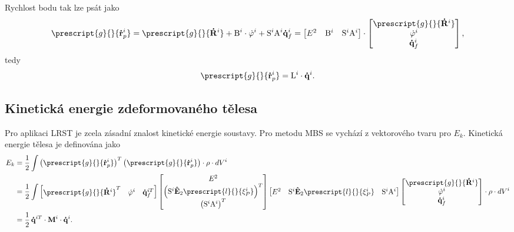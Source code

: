 Rychlost bodu tak lze psát jako
\begin{equation}\label{eq:MBS_vp}
	\prescript{g}{}{\mathbf{\dot{r}}_p^i}  =  \prescript{g}{}{\mathbf{\dot{R}}^i} + \mathrm{B}^i \cdot \dot{\varphi}^i + \mathrm{S}^{i} \mathrm{A}^i \mathbf{\dot{q}}_f^i = 
	\begin{bmatrix}
		E^2 & \mathrm{B}^i & \mathrm{S}^{i} \mathrm{A}^i
	\end{bmatrix} 
	\cdot
	\begin{bmatrix}
		\prescript{g}{}{\mathbf{\dot{R}}^i} \\ 
		\dot{\varphi}^i \\ 
		\mathbf{\dot{q}}_f^i
	\end{bmatrix}, 
\end{equation}
tedy
\begin{equation}\label{eq:MBS_derivace polohy}
	\prescript{g}{}{\mathbf{\dot{r}}_p^i}  = \mathrm{L}^i \cdot \mathbf{\dot{q}}^i.
\end{equation}

\subsection{Kinetická energie zdeformovaného tělesa}

Pro aplikaci LRST je zcela zásadní znalost kinetické energie soustavy. Pro metodu MBS se vychází z vektorového tvaru pro $ E_k $. Kinetická energie tělesa je definována jako
\begin{align}\label{eq:MBS_Ek}
	E_k &= \frac{1}{2} \int \left( \prescript{g}{}{\mathbf{\dot{r}}_p^i} \right)^T \left( \prescript{g}{}{\mathbf{\dot{r}}_p^i} \right) \cdot \rho \cdot dV^i \notag\\
	&= \frac{1}{2}\int 
	\begin{bmatrix}
		\prescript{g}{}{\mathbf{\dot{R}}^i}^T &
		\dot{\varphi}^i & 
		\mathbf{\dot{q}}_f^{iT}
	\end{bmatrix} 
	\begin{bmatrix}
		E^2 \\ \left( \mathrm{S}^{i}  \mathbf{\hat{E}}_2   \prescript{l}{}{\mathbf{\xi}^i_P}\right)^T  \\ \left( \mathrm{S}^{i} \mathrm{A}^i\right) ^T
	\end{bmatrix} 
	\begin{bmatrix}
		E^2 & \mathrm{S}^{i}  \mathbf{\hat{E}}_2   \prescript{l}{}{\mathbf{\xi}^i_P} & \mathrm{S}^{i} \mathrm{A}^i
	\end{bmatrix} 
	\begin{bmatrix}
		\prescript{g}{}{\mathbf{\dot{R}}^i} \\ 
		\dot{\varphi}^i \\ 
		\mathbf{\dot{q}}_f^i
	\end{bmatrix} 
	\cdot \rho \cdot dV^i \notag \\
	&= \frac{1}{2} \, \mathbf{\dot{q}}^{iT} \cdot \mathbf{M}^{i} \cdot \mathbf{\dot{q}}^i.
\end{align}
\newpage


